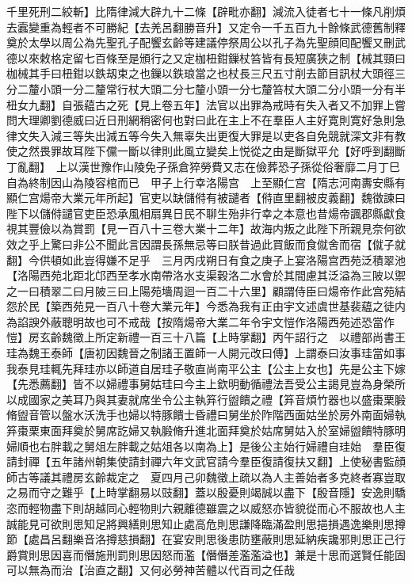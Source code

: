 千里死刑二絞斬】比隋律減大辟九十二條【辟毗亦翻】減流入徒者七十一條凡削煩去蠧變重為輕者不可勝紀【去羌呂翻勝音升】又定令一千五百九十餘條武德舊制釋奠於太學以周公為先聖孔子配饗玄齡等建議停祭周公以孔子為先聖顔囘配饗又刪武德以來敕格定留七百條至是頒行之又定枷杻鉗鏁杖笞皆有長短廣狹之制【械其頸曰枷械其手曰杻鉗以鉄刼束之也鏁以鉄琅當之也杖長三尺五寸削去節目訊杖大頭徑三分二釐小頭一分二釐常行杖大頭二分七釐小頭一分七釐笞杖大頭二分小頭一分有半杻女九翻】自張藴古之死【見上卷五年】法官以出罪為戒時有失入者又不加罪上嘗問大理卿劉德威曰近日刑網稍密何也對曰此在主上不在羣臣人主好寛則寛好急則急律文失入減三等失出減五等今失入無辜失出更復大罪是以吏各自免競就深文非有教使之然畏罪故耳陛下儻一斷以律則此風立變矣上悦從之由是斷獄平允【好呼到翻斷丁亂翻】　上以漢世豫作山陵免子孫倉猝勞費又志在儉葬恐子孫從俗奢靡二月丁巳自為終制因山為陵容棺而已　甲子上行幸洛陽宫　上至顯仁宫【隋志河南夀安縣有顯仁宫煬帝大業元年所起】官吏以缺儲偫有被譴者【偫直里翻被皮義翻】魏徵諫曰陛下以儲偫譴官吏臣恐承風相扇異日民不聊生殆非行幸之本意也昔煬帝諷郡縣獻食視其豐儉以為賞罰【見一百八十三卷大業十二年】故海内叛之此陛下所親見奈何欲效之乎上驚曰非公不聞此言因謂長孫無忌等曰朕昔過此買飯而食僦舍而宿【僦子就翻】今供頓如此豈得嫌不足乎　三月丙戌朔日有食之庚子上宴洛陽宫西苑泛積翠池【洛陽西苑北距北邙西至孝水南帶洛水支渠穀洛二水會於其間慮其泛溢為三陂以禦之一曰積翠二曰月陂三曰上陽苑墻周迴一百二十六里】顧謂侍臣曰煬帝作此宫苑結怨於民【築西苑見一百八十卷大業元年】今悉為我有正由宇文述虞世基裴藴之徒内為諂諛外蔽聰明故也可不戒哉【按隋煬帝大業二年令宇文愷作洛陽西苑述恐當作愷】房玄齡魏徵上所定新禮一百三十八篇【上時掌翻】丙午詔行之　以禮部尚書王珪為魏王泰師【唐初因魏晉之制諸王置師一人開元改曰傅】上謂泰曰汝事珪當如事我泰見珪輒先拜珪亦以師道自居珪子敬直尚南平公主【公主上女也】先是公主下嫁【先悉薦翻】皆不以婦禮事舅姑珪曰今主上欽明動循禮法吾受公主謁見豈為身榮所以成國家之美耳乃與其妻就席坐令公主執笲行盥饋之禮【笲音煩竹器也以盛棗栗腶脩盥音管以盤水沃洗手也婦以特豚饋士昏禮曰舅坐於阼階西面姑坐於房外南面婦執笲棗栗東面拜奠於舅席訖婦又執腶脩升進北面拜奠於姑席舅姑入於室婦盥饋特豚明婦順也右胖載之舅俎左胖載之姑俎各以南為上】是後公主始行婦禮自珪始　羣臣復請封禪【五年諸州朝集使請封禪六年文武官請今羣臣復請復扶又翻】上使秘書監顔師古等議其禮房玄齡裁定之　夏四月己卯魏徵上疏以為人主善始者多克終者寡豈取之易而守之難乎【上時掌翻易以豉翻】蓋以殷憂則竭誠以盡下【殷音隱】安逸則驕恣而輕物盡下則胡越同心輕物則六親離德雖震之以威怒亦皆貌從而心不服故也人主誠能見可欲則思知足將興繕則思知止處高危則思謙降臨滿盈則思挹損遇逸樂則思撙節【處昌呂翻樂音洛撙慈損翻】在宴安則思後患防壅蔽則思延納疾讒邪則思正己行爵賞則思因喜而僭施刑罰則思因怒而濫【僭僭差濫濫溢也】兼是十思而選賢任能固可以無為而治【治直之翻】又何必勞神苦體以代百司之任哉

